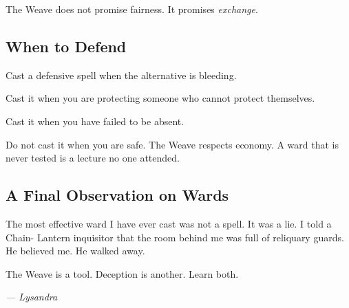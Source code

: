 The Weave does not promise fairness. It promises \emph{exchange}.

\subsection{When to Defend}

Cast a defensive spell when the alternative is bleeding.

Cast it when you are protecting someone who cannot protect themselves.

Cast it when you have failed to be absent.

Do not cast it when you are safe. The Weave respects economy. A ward that is never tested is a lecture no one attended.

\subsection{A Final Observation on Wards}

The most effective ward I have ever cast was not a spell. It was a lie. I told a Chain- Lantern inquisitor that the room behind me was full of reliquary guards. He believed me. He walked away.

The Weave is a tool. Deception is another. Learn both.

\textit{--- Lysandra}
